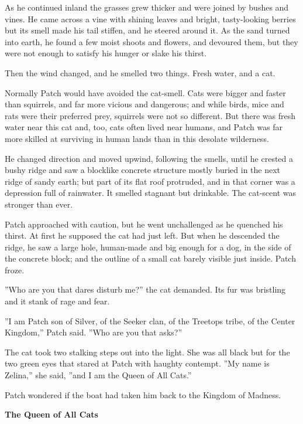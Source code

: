 \documentclass[11pt]{article}
\begin{document}
 As he continued inland the grasses grew thicker and were joined by bushes and vines. He came across a vine with shining leaves and bright, tasty-looking berries %
 but its smell made his tail stiffen, and he steered around it. As the sand turned into earth, he found a few moist shoots and flowers, and devoured them, but they were not enough to satisfy his hunger or slake his thirst.\par
 Then the wind changed, and he smelled two things. Fresh water, and a cat.\par
 Normally Patch would have avoided the cat-smell. Cats were bigger and faster than squirrels, and far more vicious and dangerous; and while birds, mice and rats were their preferred prey, squirrels were not so different. But there was fresh water near this cat %
 and, too, cats often lived near humans, and Patch was far more skilled at surviving in human lands than in this desolate wilderness.\par
 He changed direction and moved upwind, following the smells, until he crested a bushy ridge and saw a blocklike concrete structure mostly buried in the next ridge of sandy earth; but part of its flat roof protruded, and in that corner was a depression full of rainwater. It smelled stagnant but drinkable. The cat-scent was stronger than ever.\par
Patch approached with caution, but he went unchallenged as he quenched his thirst. At first he supposed the cat had just left. But when he descended the ridge, he saw a large hole, human-made and big enough for a dog, in the side of the concrete block; and the outline of a small cat barely visible just inside. Patch froze.\par
''Who are you that dares disturb me?'' the cat demanded. Its fur was bristling and it stank of rage and fear. \par
''I am Patch son of Silver, of the Seeker clan, of the Treetops tribe, of the Center Kingdom,'' Patch said. ''Who are you that asks?''\par
The cat took two stalking steps out into the light. She was all black but for the two green eyes that stared at Patch with haughty contempt. ''My name is Zelina,'' she said, ''and I am the Queen of All Cats.''\par
Patch wondered if the boat had taken him back to the Kingdom of Madness.\par
\par
{\bf The Queen of All Cats\par
}\par
\end{document}
